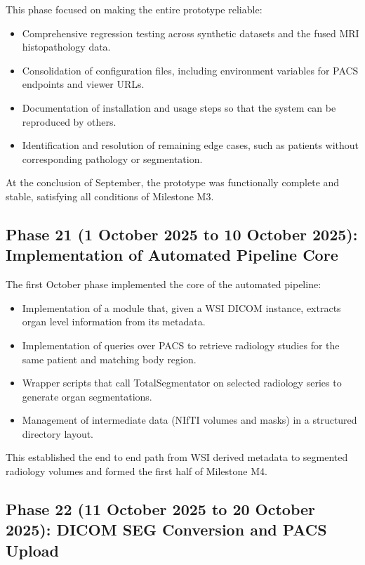 \documentclass[11pt,a4paper]{article}
\begin{document}
This phase focused on making the entire prototype reliable:

\begin{itemize}
    \item Comprehensive regression testing across synthetic datasets and the fused MRI histopathology data.
    \item Consolidation of configuration files, including environment variables for PACS endpoints and viewer URLs.
    \item Documentation of installation and usage steps so that the system can be reproduced by others.
    \item Identification and resolution of remaining edge cases, such as patients without corresponding pathology or segmentation.
\end{itemize}

At the conclusion of September, the prototype was functionally complete and stable, satisfying all conditions of Milestone M3.

\subsection*{Phase 21 (1 October 2025 to 10 October 2025): Implementation of Automated Pipeline Core}

The first October phase implemented the core of the automated pipeline:

\begin{itemize}
    \item Implementation of a module that, given a WSI DICOM instance, extracts organ level information from its metadata.
    \item Implementation of queries over PACS to retrieve radiology studies for the same patient and matching body region.
    \item Wrapper scripts that call TotalSegmentator on selected radiology series to generate organ segmentations.
    \item Management of intermediate data (NIfTI volumes and masks) in a structured directory layout.
\end{itemize}

This established the end to end path from WSI derived metadata to segmented radiology volumes and formed the first half of Milestone M4.

\subsection*{Phase 22 (11 October 2025 to 20 October 2025): DICOM SEG Conversion and PACS Upload}
\end{document}
